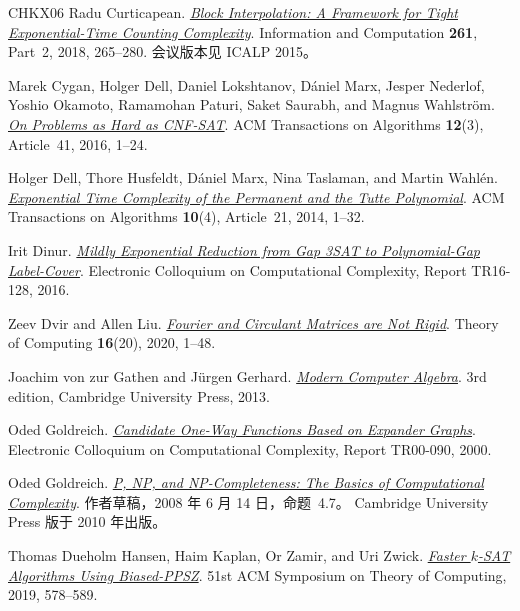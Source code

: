 \documentclass[11pt,reqno]{amsart}
\numberwithin{equation}{section}
\theoremstyle{definition}\newtheorem{definition}[theorem]{定义}
\theoremstyle{remark}\newtheorem{remark}[theorem]{注}
\begin{document}
\begin{thebibliography}{CHKX06}
Radu Curticapean.
\href{https://doi.org/10.1016/j.ic.2018.02.008}
{\emph{Block Interpolation: A Framework for Tight Exponential-Time
Counting Complexity}}.
Information and Computation \textbf{261}, Part~2, 2018, 265--280.
会议版本见 ICALP 2015。

Marek Cygan, Holger Dell, Daniel Lokshtanov, D\'aniel Marx,
Jesper Nederlof, Yoshio Okamoto, Ramamohan Paturi, Saket Saurabh,
and Magnus Wahlstr\"om.
\href{https://doi.org/10.1145/2925416}
{\emph{On Problems as Hard as CNF-SAT}}.
ACM Transactions on Algorithms \textbf{12}(3), Article~41, 2016, 1--24.

Holger Dell, Thore Husfeldt, D\'aniel Marx, Nina Taslaman, and Martin Wahl\'en.
\href{https://arxiv.org/abs/1206.1775}
{\emph{Exponential Time Complexity of the Permanent and the Tutte Polynomial}}.
ACM Transactions on Algorithms \textbf{10}(4), Article~21, 2014, 1--32.

Irit Dinur.
\href{https://eccc.weizmann.ac.il/report/2016/128/}
{\emph{Mildly Exponential Reduction from Gap 3SAT to Polynomial-Gap
Label-Cover}}.
Electronic Colloquium on Computational Complexity, Report TR16-128, 2016.

Zeev Dvir and Allen Liu.
\href{https://theoryofcomputing.org/articles/v016a020/}
{\emph{Fourier and Circulant Matrices are Not Rigid}}.
Theory of Computing \textbf{16}(20), 2020, 1--48.

Joachim von zur Gathen and J\"urgen Gerhard.
\href{https://doi.org/10.1017/CBO9781139856065}{\emph{Modern Computer Algebra}}.
3rd edition, Cambridge University Press, 2013.

Oded Goldreich.
\href{https://eccc.weizmann.ac.il/eccc-reports/2000/TR00-090/index.html}
{\emph{Candidate One-Way Functions Based on Expander Graphs}}.
Electronic Colloquium on Computational Complexity, Report TR00-090, 2000.

Oded Goldreich.
\href{https://www.wisdom.weizmann.ac.il/~oded/CC/bc-1.pdf}
{\emph{P, NP, and NP-Completeness: The Basics of Computational Complexity}}.
作者草稿，2008 年 6 月 14 日，命题~4.7。
Cambridge University Press 版于 2010 年出版。

Thomas Dueholm Hansen, Haim Kaplan, Or Zamir, and Uri Zwick.
\href{https://doi.org/10.1145/3313276.3316359}
{\emph{Faster $k$-SAT Algorithms Using Biased-PPSZ}}.
51st ACM Symposium on Theory of Computing, 2019, 578--589.


\end{thebibliography}
\end{document}
